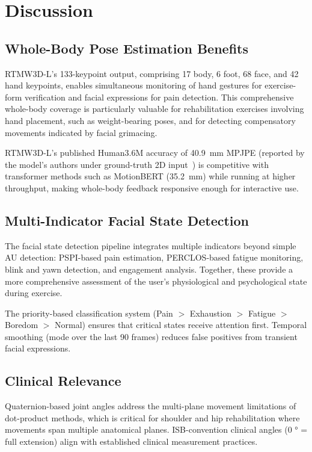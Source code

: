 \section{Discussion}
\label{sec:discussion}

\subsection{Whole-Body Pose Estimation Benefits}
RTMW3D-L's 133-keypoint output, comprising 17 body, 6 foot, 68 face, and 42 hand keypoints, enables simultaneous monitoring of hand gestures for exercise-form verification and facial expressions for pain detection. This comprehensive whole-body coverage is particularly valuable for rehabilitation exercises involving hand placement, such as weight-bearing poses, and for detecting compensatory movements indicated by facial grimacing.

RTMW3D-L's published Human3.6M accuracy of 40.9~mm MPJPE (reported by the model's authors under ground-truth 2D input~\cite{jiang2024rtmw}) is competitive with transformer methods such as MotionBERT (35.2~mm) while running at higher throughput, making whole-body feedback responsive enough for interactive use.

\subsection{Multi-Indicator Facial State Detection}
The facial state detection pipeline integrates multiple indicators beyond simple AU detection: PSPI-based pain estimation, PERCLOS-based fatigue monitoring, blink and yawn detection, and engagement analysis. Together, these provide a more comprehensive assessment of the user's physiological and psychological state during exercise.

The priority-based classification system (Pain $>$ Exhaustion $>$ Fatigue $>$ Boredom $>$ Normal) ensures that critical states receive attention first. Temporal smoothing (mode over the last 90 frames) reduces false positives from transient facial expressions.

\subsection{Clinical Relevance}
Quaternion-based joint angles address the multi-plane movement limitations of dot-product methods, which is critical for shoulder and hip rehabilitation where movements span multiple anatomical planes. ISB-convention clinical angles (0 ° = full extension) align with established clinical measurement practices.

